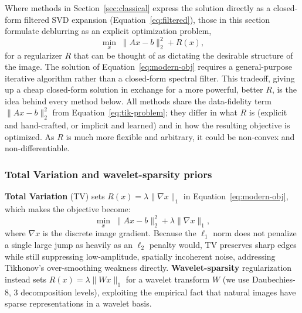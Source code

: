 \documentclass[12pt, a4paper, onecolumn]{article}
\theoremstyle{plain}          %
\theoremstyle{definition}     %
\theoremstyle{remark}
\begin{document}
Where methods in Section~\ref{sec:classical} express the solution directly as a
closed-form filtered SVD expansion (Equation~\eqref{eq:filtered}), those in this section formulate deblurring as an explicit
optimization problem,
\begin{equation}
    \min_x\; \|Ax-b\|_2^2 + R(x),
    \label{eq:modern-obj}
\end{equation}
for a regularizer $R$ that can be thought of as dictating the desirable structure of the image. The solution of Equation~\eqref{eq:modern-obj} requires a general-purpose iterative
algorithm rather than a closed-form spectral filter. This tradeoff, giving
up a cheap closed-form solution in exchange for a more powerful, better $R$, is the idea behind every method below. All methods share the data-fidelity term $\|Ax-b\|_2^2$ from
Equation~\eqref{eq:tik-problem}; they differ in what $R$ is (explicit and
hand-crafted, or implicit and learned) and in how the resulting objective is optimized. As $R$ is much more flexible and arbitrary, it could be non-convex and non-differentiable.

\subsubsection{Total Variation and wavelet-sparsity priors}

\textbf{Total Variation} (TV) \cite{rof1992} sets $R(x)=\lambda\|\nabla x\|_1$
in Equation~\eqref{eq:modern-obj}, which makes the objective become:
\begin{equation}
    \min_x\; \|Ax-b\|_2^2 + \lambda\|\nabla x\|_1,
    \label{eq:tv}
\end{equation}
where $\nabla x$ is the discrete image gradient. Because the $\ell_1$
norm does not penalize a single large jump as heavily as an $\ell_2$
penalty would, TV preserves sharp edges while still suppressing low-amplitude, spatially incoherent noise, addressing Tikhonov's over-smoothing weakness directly. \textbf{Wavelet-sparsity} regularization instead sets $R(x)=\lambda\|Wx\|_1$ for a wavelet transform
$W$ (we use Daubechies-8, 3 decomposition levels), exploiting the empirical fact that natural images have sparse representations in a wavelet basis.
\end{document}
